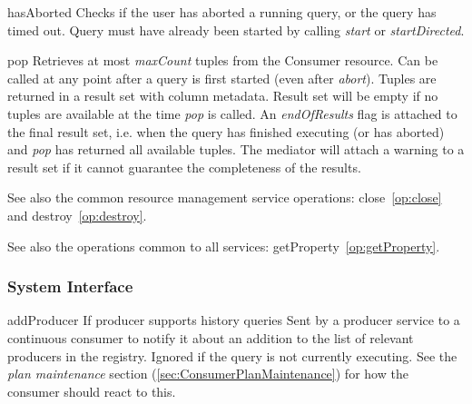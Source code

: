 \begin{method}{hasAborted}
\desc Checks if the user has aborted a running query, or the query has timed
out. Query must have already been started by calling \textit{start} or
\textit{startDirected}.
\end{method}

\begin{method}{pop}
\desc Retrieves at most \textit{maxCount} tuples from the Consumer resource. Can
be
called at any point after a query is first started (even after \textit{abort}).
Tuples are returned in a result set with column metadata. Result set will be empty if no tuples are available
at the time \textit{pop} is called. An \textit{endOfResults} flag is attached to the
final result set, i.e. when the query has finished executing (or has aborted)
and \textit{pop} has returned all available tuples. The mediator will attach a
warning to a result set if it cannot guarantee the completeness of the results.\\
\end{method}

See also the common resource management service operations:
close~\ref{op:close} and 
destroy~\ref{op:destroy}.

See also the operations common to all services:
getProperty~\ref{op:getProperty}.

\subsubsection{System Interface}

\begin{method}{addProducer}
 {If producer supports history queries}
\OK
\desc Sent by a producer service to a continuous consumer to notify
it about an
addition to the list of relevant producers in the registry. Ignored if the
query is not currently executing. See the \textit{plan maintenance} section
(\ref{sec:ConsumerPlanMaintenance}) for how the consumer should react to this.
\end{method}

